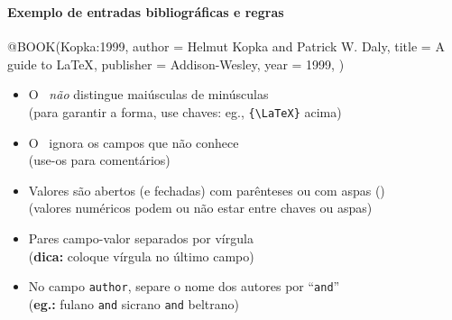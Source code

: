 \documentclass[handout,10pt]{beamer}
\begin{document}
\begin{frame}[fragile]\footnotesize
	\frametitle{\bibtex}
	\framesubtitle{Exemplo de entradas bibliográficas e regras}

	\begin{minipage}{\textwidth}\ttfamily
		\begin{LaTeXcode}
			@BOOK(Kopka:1999,
			  author = {Helmut Kopka and Patrick W. Daly},
			  title = {A guide to {\LaTeX}},
			  publisher = {Addison-Wesley},
			  year = 1999,
			)
		\end{LaTeXcode}
	\end{minipage}
			
	\begin{itemize}
		\item<2-> O \bibtex\ \emph{não} distingue maiúsculas de minúsculas\\
			{\tiny(para garantir a forma, use chaves: eg., \verb|{\LaTeX}| acima)}
			
		\item<3-> O \bibtex\ ignora os campos que não conhece\\
			{\tiny(use-os para comentários)}
			
		\item<4-> Valores são abertos (e fechadas) com parênteses ou com aspas
			(\alert<4>{\textquotedbl})\\
			{\tiny(valores numéricos podem ou não estar entre chaves ou aspas)}
			
		\item<5-> Pares campo-valor separados por vírgula\\
			{\tiny(\textbf{dica:} coloque vírgula no último campo)}
				
		\item<6-> No campo \texttt{author}, separe o nome dos autores por
			``\texttt{and}''\\
			{\tiny(\textbf{eg.:} fulano \texttt{and} sicrano \texttt{and} beltrano)}
	\end{itemize}
\end{frame}
\end{document}
